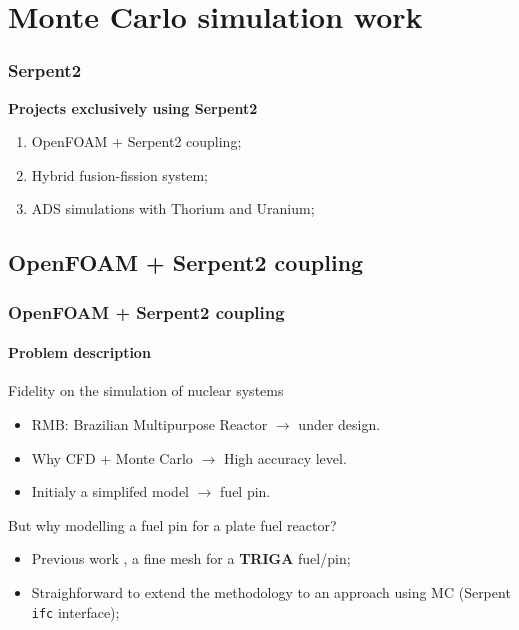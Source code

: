 \documentclass[svgnames,smaller,table]{beamer}
\begin{document}
\section{Monte Carlo simulation work}
\begin{frame}
  \frametitle{Serpent2}
  \textbf{Projects exclusively using Serpent2}
  \vspace{10px}
  \begin{enumerate}
    \item OpenFOAM + Serpent2 coupling;
    \item Hybrid fusion-fission system;
    \item ADS simulations with Thorium and Uranium;
    \end{enumerate}
\end{frame}

\subsection{OpenFOAM + Serpent2 coupling}
\begin{frame}
  \frametitle{OpenFOAM + Serpent2 coupling}
  \framesubtitle{Problem description}
  \begin{center}
    \alert{Fidelity on the simulation of nuclear systems}\\
    \vspace{10px}
    \begin{itemize}
    \item RMB: Brazilian Multipurpose Reactor $\rightarrow$ under design.
    \item Why CFD + Monte Carlo $\rightarrow$ High accuracy level.
    \item Initialy a simplifed model $\rightarrow$ fuel pin.
    \end{itemize}
    \vspace{10px}
    \alert{But why modelling a fuel pin for a plate fuel reactor?}
    \vspace{10px}
    \begin{itemize}
    \item Previous work \cite{Vasconcelos2018}, a fine mesh for a \textbf{TRIGA} fuel/pin;
    \item Straighforward to extend the methodology to an approach using MC (Serpent \texttt{ifc} interface);
    \end{itemize}
  \end{center}
\end{frame}
\end{document}
